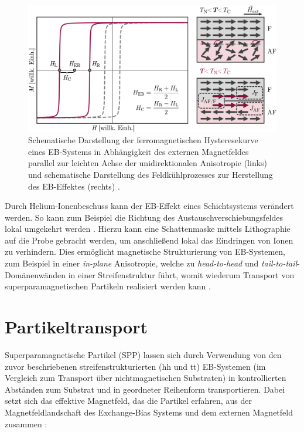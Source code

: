 \documentclass[page,pdftex,12pt,a4paper,twoside,openright]{scrbook}
\begin{document}
\begin{figure}[!h]
\centering
\includegraphics[width=\textwidth]{img/eb.png}
\caption{\label{fig-eb}
Schematische Darstellung der ferromagnetischen Hysteresekurve eines EB-Systems in Abhängigkeit des externen Magnetfeldes parallel zur leichten Achse der unidirektionalen Anisotropie (links) und schematische Darstellung des Feldkühlprozesses zur Herstellung des EB-Effektes (rechts) \cite{merkel_einfluss_2018}.}
\end{figure}

Durch Helium-Ionenbeschuss kann der EB-Effekt eines Schichtsystems verändert werden. So kann zum Beispiel die Richtung des Austauschverschiebungsfeldes lokal umgekehrt werden \cite{mougin_local_2001}. Hierzu kann eine Schattenmaske mittels Lithographie auf die Probe gebracht werden, um anschließend lokal das Eindringen von Ionen zu verhindern. Dies ermöglicht magnetische Strukturierung von EB-Systemen, zum Beispiel in einer \emph{in-plane} Anisotropie, welche zu \emph{head-to-head} und \emph{tail-to-tail}-Domänenwänden in einer Streifenstruktur führt, womit wiederum Transport von superparamagnetischen Partikeln realisiert werden kann \cite{holzinger_directed_2015}.

\section{Partikeltransport \label{sec-partikeltransport}}
\label{sec:org3cf4141}
Superparamagnetische Partikel (SPP) lassen sich durch Verwendung von den zuvor beschriebenen streifenstrukturierten (hh und tt) EB-Systemen (im Vergleich zum Transport über nichtmagnetischen Substraten) in kontrollierten Abständen zum Substrat und in geordneter Reihenform transportieren. Dabei setzt sich das effektive Magnetfeld, das die Partikel erfahren, aus der Magnetfeldlandschaft des Exchange-Bias Systems und dem externen Magnetfeld zusammen \cite{holzinger_directed_2015}:
\end{document}
